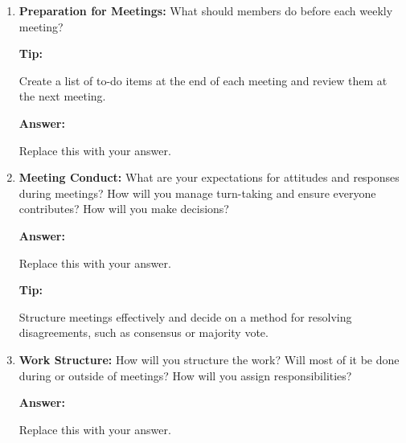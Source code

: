 \documentclass[12pt]{article}
\newenvironment{answer}[1][]{
  \color{blue}\textbf{Answer:}
}{}
\newenvironment{alice}[1][]{
  \color{black}\textbf{Tip:}
}{}
\begin{document}
\begin{enumerate}
\begin{alice}

Schedule a mandatory weekly meeting to stay on track and address issues promptly.
\end{alice}

\begin{answer}

We will be using Discord to communicate. The expected response time should be at most a couple of hours. We plan on doing a weekly virtual meeting on Discord to keep everyone up to date and address any issues or difficulties. 

\end{answer}

\item {\bf Preparation for Meetings:} What should members do before each weekly meeting?

\begin{alice}

Create a list of to-do items at the end of each meeting and review them at the next meeting.

\end{alice}

\begin{answer}

Replace this with your answer.
\end{answer}


\item {\bf Meeting Conduct:} What are your expectations for attitudes and responses during meetings? How will you manage turn-taking and ensure everyone contributes? How will you make decisions?

\begin{answer}

Replace this with your answer.
\end{answer}

\begin{alice}

Structure meetings effectively and decide on a method for resolving disagreements, such as consensus or majority vote.
\end{alice}

\item {\bf Work Structure:} How will you structure the work? Will most of it be done during or outside of meetings? How will you assign responsibilities?

\begin{answer}

Replace this with your answer.
\end{answer}


\end{enumerate}
\end{document}
